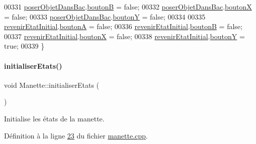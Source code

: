\begin{DoxyCode}
00331     \hyperlink{class_manette_a93fc38a8ca8fbb1cc57cedbab059c56f}{poserObjetDansBac}.\hyperlink{struct_etat_manette_bouton_a2a0f4d809b1b9b814fa689113becaad7}{boutonB} = \textcolor{keyword}{false};
00332     \hyperlink{class_manette_a93fc38a8ca8fbb1cc57cedbab059c56f}{poserObjetDansBac}.\hyperlink{struct_etat_manette_bouton_a4a1d74300413624fd13841eb11c6e974}{boutonX} = \textcolor{keyword}{false};
00333     \hyperlink{class_manette_a93fc38a8ca8fbb1cc57cedbab059c56f}{poserObjetDansBac}.\hyperlink{struct_etat_manette_bouton_aae061f9e32f970787226ef9e0bdb5a17}{boutonY} = \textcolor{keyword}{false};
00334 
00335     \hyperlink{class_manette_a4c0e9611f08e363feb0a24f8c9d258f2}{revenirEtatInitial}.\hyperlink{struct_etat_manette_bouton_a0a1bcb57b5ce1a3f4ff6de5e8749c052}{boutonA} = \textcolor{keyword}{false};
00336     \hyperlink{class_manette_a4c0e9611f08e363feb0a24f8c9d258f2}{revenirEtatInitial}.\hyperlink{struct_etat_manette_bouton_a2a0f4d809b1b9b814fa689113becaad7}{boutonB} = \textcolor{keyword}{false};
00337     \hyperlink{class_manette_a4c0e9611f08e363feb0a24f8c9d258f2}{revenirEtatInitial}.\hyperlink{struct_etat_manette_bouton_a4a1d74300413624fd13841eb11c6e974}{boutonX} = \textcolor{keyword}{false};
00338     \hyperlink{class_manette_a4c0e9611f08e363feb0a24f8c9d258f2}{revenirEtatInitial}.\hyperlink{struct_etat_manette_bouton_aae061f9e32f970787226ef9e0bdb5a17}{boutonY} = \textcolor{keyword}{true};
00339 \}
\end{DoxyCode}
\mbox{\label{class_manette_afd722561b4cc62304e81a8e41c820bb8}} 
\paragraph{\texorpdfstring{initialiser\+Etats()}{initialiserEtats()}}
{\footnotesize\ttfamily void Manette\+::initialiser\+Etats (\begin{DoxyParamCaption}{ }\end{DoxyParamCaption})\hspace{0.3cm}{\ttfamily [private]}}



Initialise les états de la manette. 



Définition à la ligne \hyperlink{manette_8cpp_source_l00023}{23} du fichier \hyperlink{manette_8cpp_source}{manette.\+cpp}.



